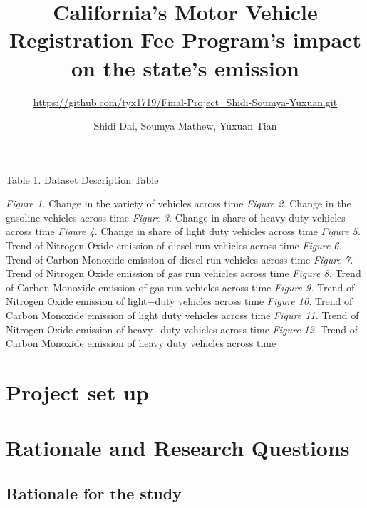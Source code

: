 \documentclass[
  12pt,
]{article}
\title{California's Motor Vehicle Registration Fee Program's impact on
the state's emission}
\subtitle{\url{https://github.com/tyx1719/Final-Project_Shidi-Soumya-Yuxuan.git}}
\author{Shidi Dai, Soumya Mathew, Yuxuan Tian}
\date{}
\begin{document}
\maketitle

\newpage
\tableofcontents 
\newpage
\listoftables

Table 1. Dataset Description Table \newpage

\listoffigures

\emph{Figure 1.} Change in the variety of vehicles across time
\emph{Figure 2.} Change in the gasoline vehicles across time
\emph{Figure 3.} Change in share of heavy duty vehicles across time
\emph{Figure 4.} Change in share of light duty vehicles across time
\emph{Figure 5.} Trend of Nitrogen Oxide emission of diesel run vehicles
across time \emph{Figure 6.} Trend of Carbon Monoxide emission of diesel
run vehicles across time \emph{Figure 7.} Trend of Nitrogen Oxide
emission of gas run vehicles across time \emph{Figure 8.} Trend of
Carbon Monoxide emission of gas run vehicles across time \emph{Figure
9.} Trend of Nitrogen Oxide emission of light−duty vehicles across time
\emph{Figure 10.} Trend of Carbon Monoxide emission of light duty
vehicles across time \emph{Figure 11.} Trend of Nitrogen Oxide emission
of heavy−duty vehicles across time \emph{Figure 12.} Trend of Carbon
Monoxide emission of heavy duty vehicles across time \newpage

\hypertarget{project-set-up}{%
\section{Project set up}\label{project-set-up}}

\hypertarget{rationale-and-research-questions}{%
\section{Rationale and Research
Questions}\label{rationale-and-research-questions}}

\hypertarget{rationale-for-the-study}{%
\subsection{Rationale for the study}\label{rationale-for-the-study}}
\end{document}
